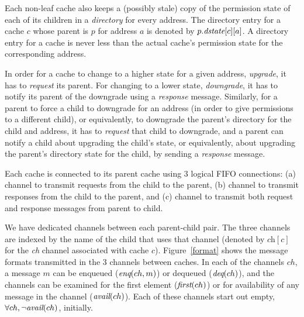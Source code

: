 
Each non-leaf cache also keeps a (possibly stale) copy of the permission state of
each of its children in a \emph{directory} for every address. The directory
entry for a cache $c$ whose parent is $p$ for address $a$ is denoted by
$p.\textit{dstate}[c][a]$. A directory entry for a cache is never
less than the actual cache's permission state for the corresponding address.

In order for a cache to change to a higher state for a given address, \ie{}
\emph{upgrade}, it has to \emph{request} its parent.  For changing to a lower
state, \ie{} \emph{downgrade}, it has to notify its parent of the downgrade
using a \emph{response} message.  Similarly, for a parent to force a child to
downgrade for an address (in order to give permissions to a different child),
or equivalently, to downgrade the parent's directory for the child and address,
it has to \emph{request} that child to downgrade, and a parent can notify a
child about upgrading the child's state, or equivalently, about upgrading the
parent's directory state for the child, by sending a \emph{response} message.

Each cache is connected to its parent cache using 3 logical FIFO connections:
(a) \cpReq{} channel to transmit requests from the child to the parent, (b)
\cpResp{} channel to transmit responses from the child to the parent, and (c)
\pc{} channel to transmit both request and response messages from parent to
child. 

We have dedicated channels between each parent-child pair. The three channels
are indexed by the name of the child that uses that channel (denoted by
$\textit{ch}[c]$ for the \textit{ch} channel associated
with cache $c$).  Figure~\ref{format} shows the message formats
transmitted in the 3
channels between caches. In each of the channels $ch$, a message $m$
can be enqueued ($\textit{enq}(ch, m)$) or dequeued ($\textit{deq}(ch)$), and the
channels can be examined for the first element ($\textit{first}(ch)$) or for
availability of any message in the channel
($\textit{avail}(ch)$). Each of these channels start out empty, \ie{} $\forall ch,
\neg \textit{avail}(ch)$, initially.

